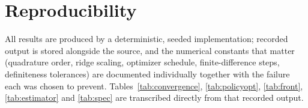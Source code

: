 \documentclass[11pt]{article}
\theoremstyle{plain}
\theoremstyle{definition}
\begin{document}
\section*{Reproducibility}

All results are produced by a deterministic, seeded implementation; recorded
output is stored alongside the source, and the numerical constants that matter
(quadrature order, ridge scaling, optimizer schedule, finite-difference steps,
definiteness tolerances) are documented individually together with the failure
each was chosen to prevent. Tables~\ref{tab:convergence}, \ref{tab:policyopt},
\ref{tab:front}, \ref{tab:estimator} and \ref{tab:spec} are transcribed directly
from that recorded output.
\end{document}
